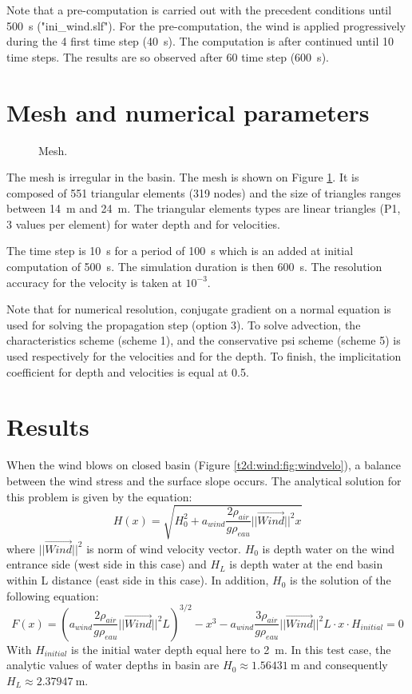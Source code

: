 \bigskip
Note that a pre-computation is carried out with the precedent conditions until 500~s 
("ini\_wind.slf"). For the pre-computation, the wind is applied progressively during 
the 4 first time step (40~s). 
The computation is after continued until 10 time steps. 
The results are so observed after 60 time step (600~s). 

\section{Mesh and numerical parameters}
\begin{figure}[!htbp]
 \centering
 \caption{Mesh.}
 \label{t2d:wind:fig:mesh}
\end{figure}

\bigskip
The mesh is irregular in the basin. The mesh is shown on Figure \ref{t2d:wind:fig:mesh}. 
It is composed of 551 triangular elements (319 nodes) and the size of triangles
ranges between 14~m and 24~m. The triangular elements types are linear triangles 
(P1, 3 values per element) for water depth and for velocities.

\bigskip
The time step is 10~s for a period of 100~s which is an added at initial computation 
of 500~s. The simulation duration is then 600~s. The resolution accuracy for the 
velocity is taken at $10^{-3}$.

\bigskip
Note that for numerical resolution, conjugate gradient on a normal equation 
is used for solving the propagation step (option 3). To solve advection, 
the characteristics scheme (scheme 1), and the conservative psi scheme (scheme 5) 
is used respectively for the velocities and for the depth. To finish, the implicitation 
coefficient for depth and velocities is equal at 0.5.\\

\section{Results}
\bigskip
When the wind blows on closed basin (Figure \ref{t2d:wind:fig:windvelo}),
a balance between the wind stress and the surface slope occurs.
The analytical solution for this problem is given by the equation:
\begin{equation}
H(x)=\sqrt{H_0^2 +a_{wind}\frac{2\rho_{air}}{g\rho_{eau}}||\vec{Wind}||^{2} x}
\end{equation}
where $||\vec{Wind}||^{2}$ is norm of wind velocity vector. $H_0$ is 
depth water on the wind entrance side (west side in this case) 
and $H_L$ is depth water at the end basin within L distance (east side in this case).
In addition, $H_0$ is the solution of the following equation: 
\begin{equation}
F(x)=\left( a_{wind}\frac{2\rho_{air}}{g\rho_{eau}}||\vec{Wind}||^{2} 
L\right)^{3/2}-x^3-a_{wind}\frac{3\rho_{air}}{g\rho_{eau}}||\vec{Wind}||^{2}
L\cdot x\cdot H_{initial}=0
\end{equation}
With $H_{initial}$ is the initial water depth equal here to 2~m.
In this test case, the analytic values of water depths in basin are 
$H_0 \approx 1.56431~\text{m}$ and consequently $H_L \approx 2.37947~\text{m}$.


